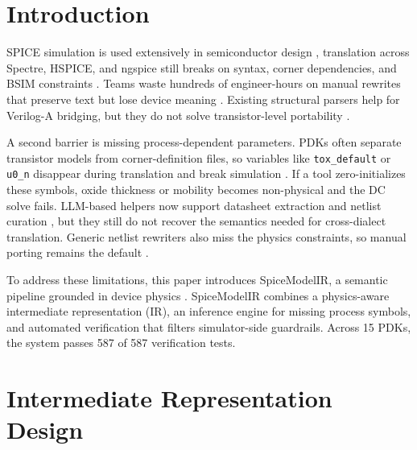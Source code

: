\documentclass[conference]{IEEEtran}
\begin{document}
\section{Introduction}
\label{sec:introduction}

 SPICE simulation is used extensively in semiconductor design \cite{Pratap_2014, Kundert_1995, Vogt_ngspice, a2024_single}, translation across Spectre, HSPICE, and ngspice still breaks on syntax, corner dependencies, and BSIM constraints \cite{Chhabria_2025, Goldman_2000}. Teams waste hundreds of engineer-hours on manual rewrites that preserve text but lose device meaning \cite{Dahad_2021, spiceerror, engineererror, a2024_kb}. Existing structural parsers help for Verilog-A bridging, but they do not solve transistor-level portability \cite{Shao_2023_V2Va, Wang_2024_V2VaPlus}.

A second barrier is missing process-dependent parameters. PDKs often separate transistor models from corner-definition files, so variables like \texttt{tox\_default} or \texttt{u0\_n} disappear during translation and break simulation \cite{Hu_1996}. If a tool zero-initializes these symbols, oxide thickness or mobility becomes non-physical and the DC solve fails. LLM-based helpers now support datasheet extraction and netlist curation \cite{Chen_2025_D2S, Chen_2024_DocEDA, Bhandari_2024, Vungarala_2024_SPICEPilot}, but they still do not recover the semantics needed for cross-dialect translation. Generic netlist rewriters \cite{DallOra_2025} also miss the physics constraints, so manual porting remains the default \cite{Zhu_2012, spicesec2025}.

To address these limitations, this paper introduces SpiceModelIR, a semantic pipeline grounded in device physics \cite{Vladimirescu_1994, Tuinenga_1995, Tsividis_2011, Sze_2007, Baker_2010, Rabaey_2003, Lee_2004, Mead_1980, Cheng_1999_MOSFET, Chauhan_BSIMCMG_2020}. SpiceModelIR combines a physics-aware intermediate representation (IR), an inference engine for missing process symbols, and automated verification that filters simulator-side guardrails. Across 15 PDKs, the system passes 587 of 587 verification tests.
\section{Intermediate Representation Design}
\label{sec:ir_design}
\vspace{-0.6cm}
\end{document}
